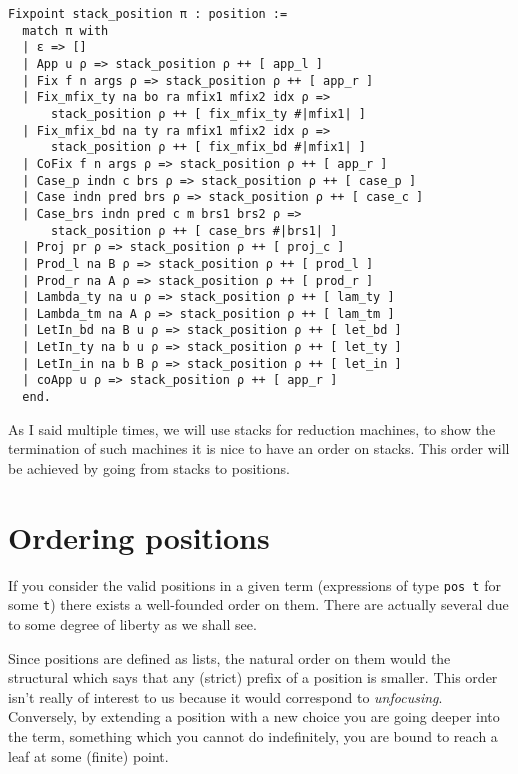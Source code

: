\begin{verbatim}
Fixpoint stack_position π : position :=
  match π with
  | ε => []
  | App u ρ => stack_position ρ ++ [ app_l ]
  | Fix f n args ρ => stack_position ρ ++ [ app_r ]
  | Fix_mfix_ty na bo ra mfix1 mfix2 idx ρ =>
      stack_position ρ ++ [ fix_mfix_ty #|mfix1| ]
  | Fix_mfix_bd na ty ra mfix1 mfix2 idx ρ =>
      stack_position ρ ++ [ fix_mfix_bd #|mfix1| ]
  | CoFix f n args ρ => stack_position ρ ++ [ app_r ]
  | Case_p indn c brs ρ => stack_position ρ ++ [ case_p ]
  | Case indn pred brs ρ => stack_position ρ ++ [ case_c ]
  | Case_brs indn pred c m brs1 brs2 ρ =>
      stack_position ρ ++ [ case_brs #|brs1| ]
  | Proj pr ρ => stack_position ρ ++ [ proj_c ]
  | Prod_l na B ρ => stack_position ρ ++ [ prod_l ]
  | Prod_r na A ρ => stack_position ρ ++ [ prod_r ]
  | Lambda_ty na u ρ => stack_position ρ ++ [ lam_ty ]
  | Lambda_tm na A ρ => stack_position ρ ++ [ lam_tm ]
  | LetIn_bd na B u ρ => stack_position ρ ++ [ let_bd ]
  | LetIn_ty na b u ρ => stack_position ρ ++ [ let_ty ]
  | LetIn_in na b B ρ => stack_position ρ ++ [ let_in ]
  | coApp u ρ => stack_position ρ ++ [ app_r ]
  end.
\end{verbatim}

As I said multiple times, we will use stacks for reduction machines, to show the
termination of such machines it is nice to have an order on stacks. This order
will be achieved by going from stacks to positions.

\section{Ordering positions}

If you consider the valid positions in a given term (\ie expressions of type
\texttt{pos t} for some \texttt{t}) there exists a
well-founded order on them. There are actually several due to some degree of
liberty as we shall see.

Since positions are defined as lists, the natural order on them would the
structural which says that any (strict) prefix of a position is smaller.
This order isn't really of interest to us because it would correspond to
\emph{unfocusing}.
Conversely, by extending a position with a new choice you are going deeper into
the term, something which you cannot do indefinitely, you are bound to reach a
leaf at some (finite) point.

